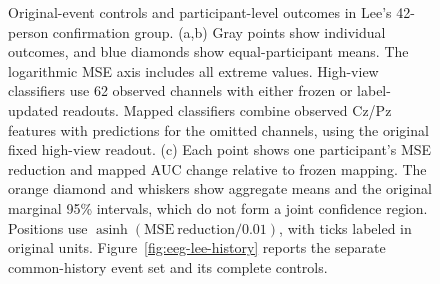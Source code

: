 \begin{figure}[p]
\caption{Original-event controls and participant-level outcomes in Lee's 42-person confirmation group. (a,b) Gray points show individual outcomes, and blue diamonds show equal-participant means. The logarithmic MSE axis includes all extreme values. High-view classifiers use 62 observed channels with either frozen or label-updated readouts. Mapped classifiers combine observed Cz/Pz features with predictions for the omitted channels, using the original fixed high-view readout. (c) Each point shows one participant's MSE reduction and mapped AUC change relative to frozen mapping. The orange diamond and whiskers show aggregate means and the original marginal 95\% intervals, which do not form a joint confidence region. Positions use $\operatorname{asinh}(\mathrm{MSE\ reduction}/0.01)$, with ticks labeled in original units. Figure~\ref{fig:eeg-lee-history} reports the separate common-history event set and its complete controls.}
\label{fig:eeg-lee-endpoints}
\end{figure}
